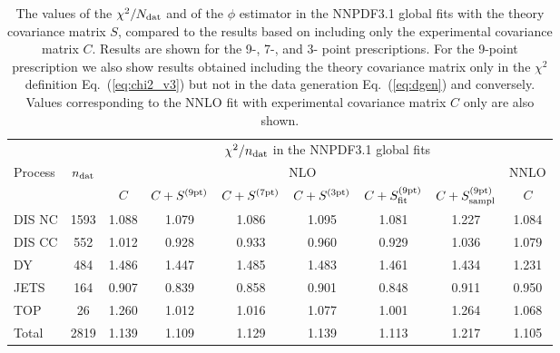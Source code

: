 \begin{table}[t]
\begin{center}
\renewcommand*{\arraystretch}{1.78}
\footnotesize
\begin{tabular}{|l|c|c|ccc|cc|c|}
  \toprule
  &    & \multicolumn{7}{c|}{$\chi^2/n_{\rm dat}$ in the NNPDF3.1 global fits}   \\
 Process & $n_{\rm dat}$ & \multicolumn{6}{c|}{NLO}  & NNLO  \\
 &  & $C$ & $C+S^{(\rm 9pt)}$   &  $C+S^{(\rm 7pt)}$  &  $C+S^{(\rm 3pt)}$ & $C+S^{(\rm 9pt)}_{\rm fit}$ &
  $C+S^{(\rm 9pt)}_{\rm sampl}$   &  $C$ \\
\toprule
DIS NC    & 1593 & 1.088  & 1.079   & 1.086 & 1.095 & 1.081 & 1.227 & 1.084 \\
DIS CC    & 552  & 1.012  & 0.928   & 0.933 & 0.960 & 0.929 & 1.036 & 1.079 \\
\midrule  
DY        & 484  & 1.486  & 1.447   & 1.485 & 1.483 & 1.461 & 1.434 & 1.231 \\
JETS      & 164  & 0.907  & 0.839   & 0.858 & 0.901 & 0.848 & 0.911 & 0.950 \\
TOP       & 26   & 1.260  & 1.012   & 1.016 & 1.077 & 1.001 & 1.264 & 1.068 \\
\midrule
Total     & 2819 & 1.139  & 1.109   & 1.129 & 1.139 & 1.113 & 1.217 & 1.105 \\
\bottomrule
\end{tabular}
\end{center}
\caption{The values of the $\chi^2/N_{\rm dat}$ and of the $\phi$ estimator
  in the NNPDF3.1 global fits
  with the theory covariance matrix $S$, compared to the results based on including only
  the experimental covariance matrix $C$. Results are shown
for  the 9-, 7-, and 3- point prescriptions.
  For the 9-point prescription we also show  results obtained
  including the theory covariance matrix
only in the $\chi^2$ definition Eq.~(\ref{eq:chi2_v3}) but not
in the data generation Eq.~(\ref{eq:dgen}) and conversely.
  Values corresponding to the
  NNLO fit with  experimental covariance matrix $C$ only are also shown.
  \label{table:chi2table_covth_global_nlo}
}
  \end{table}
